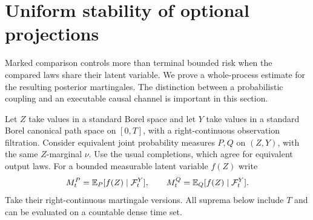 \section{Uniform stability of optional projections}
\label{sec:v17-optional}

Marked comparison controls more than terminal bounded risk when the
compared laws share their latent variable. We prove a whole-process
estimate for the resulting posterior martingales. The distinction
between a probabilistic coupling and an executable causal channel is
important in this section.

Let $Z$ take values in a standard Borel space and let $Y$ take values
in a standard Borel canonical path space on $[0,T]$, with a
right-continuous observation filtration. Consider equivalent joint
probability measures $P,Q$ on $(Z,Y)$, with the same $Z$-marginal
$\nu$. Use the usual completions, which agree for equivalent output
laws. For a bounded measurable latent variable $f(Z)$ write
\[
 M^P_t=\mathbb E_P[f(Z)\mid\mathcal F^Y_t],\qquad
 M^Q_t=\mathbb E_Q[f(Z)\mid\mathcal F^Y_t].
\]
Take their right-continuous martingale versions. All suprema below
include $T$ and can be evaluated on a countable dense time set.

